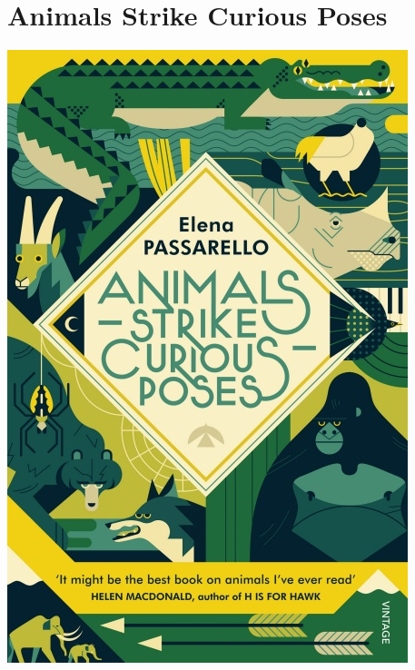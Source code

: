\documentclass{tufte-handout}
\makeatletter
\newcommand{\varcaption}[2][0pt]{%
  \gsetlength{\@tufte@caption@vertical@offset}{-#1}%
  \gdef\@tufte@stored@varcaption{#2}%
}
\gdef\@tufte@stored@varcaption{} %
\makeatother
\begin{document}
\section*{Animals Strike Curious Poses}
\begin{marginfigure}[1\baselineskip]
   \includegraphics[width=\linewidth]{images/animals_strike_curious_poses.jpg}
   \varcaption{\href{https://www.penguin.co.uk/books/111/1114747/animals-strike-curious-poses/9781784707354.html}{Publisher Link}, \href{https://www.amazon.com/Animals-Strike-Curious-Passarello-author/dp/178470735X/}{Amazon Link}}
\end{marginfigure}
\end{document}
